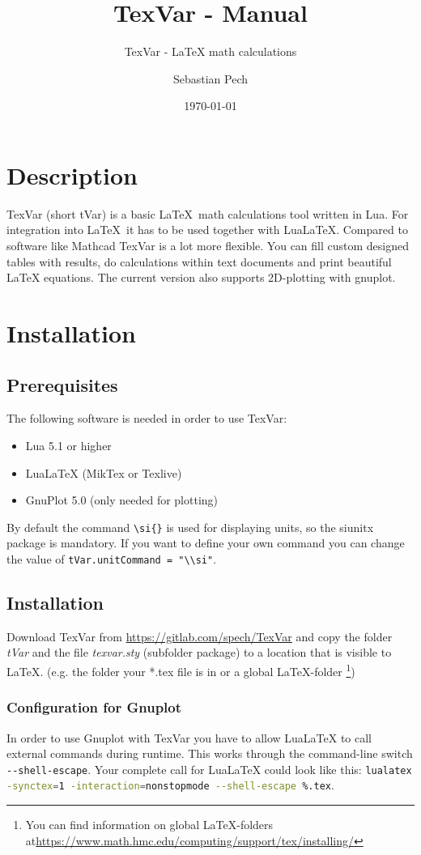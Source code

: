 \documentclass[fleqn]{mybase}
\title{TexVar - Manual}
\subtitle{TexVar - LaTeX math calculations\\[0.5 cm]\normalsize\directlua{tVar.getVersion()}}
\date{\today}
\author{Sebastian Pech}
\begin{document}
\maketitle
\tableofcontents
\section{Description}
TexVar (short tVar) is a basic \LaTeX~math calculations tool written in Lua.
For integration into \LaTeX~it has to be used together with LuaLaTeX. Compared
to software like Mathcad TexVar is a lot more flexible. You can fill custom
designed tables with results, do calculations within text documents and print
beautiful LaTeX equations. The current version also supports 2D-plotting with
gnuplot.
\section{Installation}
\subsection{Prerequisites}
The following software is needed in order to use TexVar:
\begin{itemize}
	\item Lua 5.1 or higher
	\item LuaLaTeX (MikTex or Texlive)
	\item GnuPlot 5.0 (only needed for plotting)
\end{itemize}
By default the command \verb|\si{}| is used for displaying units, so the
siunitx package is mandatory. If you want to define your own command you can
change the value of \verb|tVar.unitCommand = "\\si"|. 
\subsection{Installation}
Download TexVar from \url{https://gitlab.com/spech/TexVar} and copy the folder
\emph{tVar} and the file \emph{texvar.sty} (subfolder package) to a location
that is visible to \LaTeX. (e.g. the folder your *.tex file is in or a global
\LaTeX-folder \footnote{You can find information on global \LaTeX-folders
at\url{https://www.math.hmc.edu/computing/support/tex/installing/}})
\subsubsection{Configuration for Gnuplot}
In order to use Gnuplot with TexVar you have to allow LuaLaTeX to call external
commands during runtime. This works through the command-line switch
\lstinline[language=Bash]|--shell-escape|. Your complete call for LuaLaTeX
could look like this: \lstinline[language=Bash]|lualatex -synctex=1
-interaction=nonstopmode --shell-escape %.tex|. 
\end{document}
